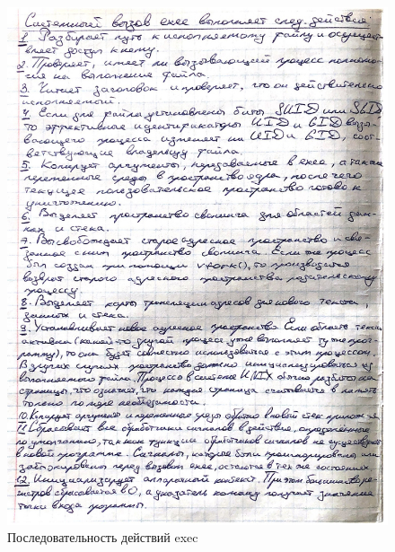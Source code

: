 \documentclass[12pt]{report}
\begin{document}
\begin{figure}[H]
	\centering
	\includegraphics[scale = 0.8]{2.jpg}
	\caption{Последовательность действий exec}
	\label{task05:demo}
\end{figure}

\newpage
\end{document}
